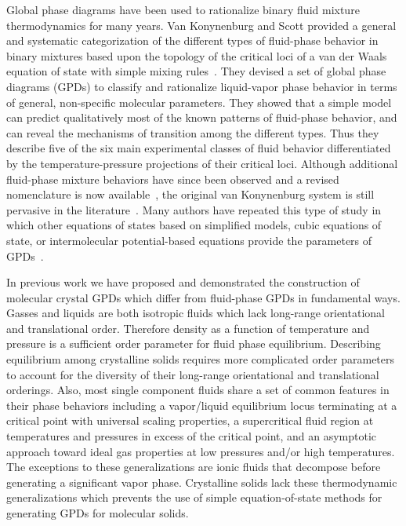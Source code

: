 \documentclass[preprint]{iucr}              %
\begin{document}
Global phase diagrams have been used to rationalize binary fluid mixture
thermodynamics for many years.  Van Konynenburg and Scott provided a general and
systematic categorization of the different types of fluid-phase behavior in
binary mixtures based upon the topology of the critical loci of a van der Waals
equation of state with simple mixing rules~\cite{vanKonynenburg80}.  They
devised a set of global phase diagrams (GPDs) to classify and rationalize
liquid-vapor phase behavior in terms of general, non-specific molecular
parameters.  They showed that a simple model can predict qualitatively most of
the known patterns of fluid-phase behavior, and can reveal the mechanisms of
transition among the different types.  Thus they describe five of the six main
experimental classes of fluid behavior differentiated by the
temperature-pressure projections of their critical loci.  Although additional
fluid-phase mixture behaviors have since been observed and a revised
nomenclature is now available~\cite{Bolz98}, the original van Konynenburg system
is still pervasive in the
literature~\cite{AparicioMartinez07a,AparicioMartinez07b,Cismondi07}. Many
authors have repeated this type of study in which other equations of states
based on simplified models, cubic equations of state, or intermolecular
potential-based equations provide the parameters of
GPDs~\cite{Polishuk00,Polishuk02,vanPelt95}.
 
In previous work we have proposed and demonstrated the construction of molecular
crystal GPDs which differ from fluid-phase GPDs in fundamental ways.  Gasses and
liquids are both isotropic fluids which lack long-range orientational and
translational order.  Therefore density as a function of temperature and
pressure is a sufficient order parameter for fluid phase equilibrium. 
Describing equilibrium among crystalline solids requires more complicated order
parameters to account for the diversity of their long-range orientational and
translational orderings.  Also, most single component fluids share a set of
common features in their phase behaviors including a vapor/liquid equilibrium
locus terminating at a critical point with universal scaling properties, a
supercritical fluid region at temperatures and pressures in excess of the
critical point, and an asymptotic approach toward ideal gas properties at low
pressures and/or high temperatures.  The exceptions to these generalizations are
ionic fluids that decompose before generating a significant vapor phase. 
Crystalline solids lack these thermodynamic generalizations which prevents the
use of simple equation-of-state methods for generating GPDs for molecular
solids.
\end{document}
